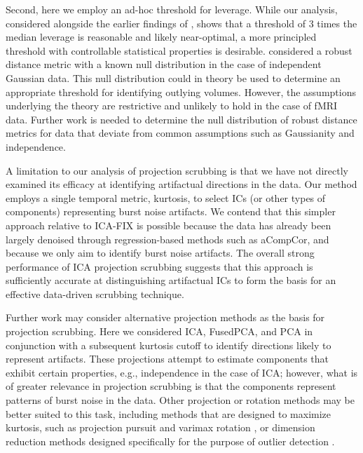 \documentclass{article}
\begin{document}
Second, here we employ an ad-hoc threshold for leverage.  While our analysis, considered alongside the earlier findings of \cite{mejiaPCALeverageOutlier2017}, shows that a threshold of 3 times the median leverage is reasonable and likely near-optimal, a more principled threshold with controllable statistical properties is desirable. \cite{mejiaPCALeverageOutlier2017} considered a robust distance metric with a known null distribution \citep{hardin2005distribution} in the case of independent Gaussian data. This null distribution could in theory be used to determine an appropriate threshold for identifying outlying volumes. However, the assumptions underlying the theory are restrictive and unlikely to hold in the case of fMRI data. Further work is needed to determine the null distribution of robust distance metrics for data that deviate from common assumptions such as Gaussianity and independence.

A limitation to our analysis of projection scrubbing is that we have not directly examined its efficacy at identifying artifactual directions in the data.  Our method employs a single temporal metric, kurtosis, to select ICs (or other types of components) representing burst noise artifacts. We contend that this simpler approach relative to ICA-FIX is possible because the data has already been largely denoised through regression-based methods such as aCompCor, and because we only aim to identify burst noise artifacts. The overall strong performance of ICA projection scrubbing suggests that this approach is sufficiently accurate at distinguishing artifactual ICs to form the basis for an effective data-driven scrubbing technique. %

Further work may consider alternative projection methods as the basis for projection scrubbing. Here we considered ICA, FusedPCA, and PCA in conjunction with a subsequent kurtosis cutoff to identify directions likely to represent artifacts. These projections attempt to estimate components that exhibit certain properties, e.g., independence in the case of ICA; however, what is of greater relevance in projection scrubbing is that the components represent patterns of burst noise in the data.  Other projection or rotation methods may be better suited to this task, including methods that are designed to maximize kurtosis, such as projection pursuit \citep{hou2011fast} and varimax rotation \citep{rohe2020vintage}, or dimension reduction methods designed specifically for the purpose of outlier detection \citep{kandanaarachchi2021dimension}. 
\end{document}
